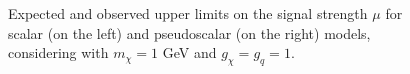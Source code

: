 \documentclass[a4paper, 10pt, openright]{report}
\begin{document}
\begin{figure}[htbp]
\caption{Expected and observed upper limits on the signal strength $\mu$ for scalar (on the left) and pseudoscalar (on the right) models, considering with $m_\chi = 1$ GeV and $g_\chi = g_q = 1$.}
\label{fig:limits}
\end{figure}
\end{document}
